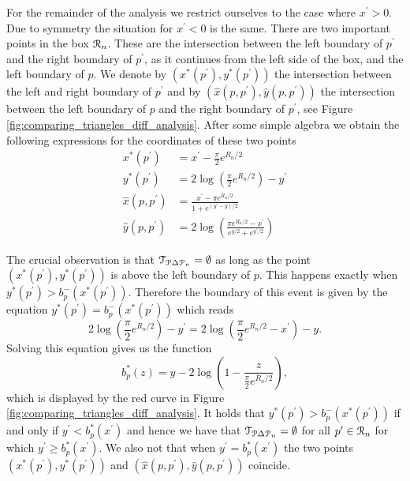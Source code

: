 For the remainder of the analysis we restrict ourselves to the case where $x^\prime > 0$. Due to symmetry the situation for $x^\prime < 0$ is the same. There are two important points in the box ${\mathcal R}_n$. These are the intersection between the left boundary of $p^\prime$ and the right boundary of $p^\prime$, as it continues from the left side of the box, and the left boundary of $p$. We denote by $(x^\ast(p^\prime), y^\ast(p^\prime))$ the intersection between the left and right boundary of $p^\prime$ and by $(\hat{x}(p,p^\prime), \hat{y}(p,p^\prime))$ the intersection between the left boundary of $p$ and the right boundary of $p^\prime$, see Figure \ref{fig:comparing_triangles_diff_analysis}. After some simple algebra we obtain the following expressions for the coordinates of these two points
\begin{align*}
	x^\ast(p^\prime) &= x^\prime - \frac{\pi}{2} e^{R_n/2}\\
	y^\ast(p^\prime) &= 2\log\left(\frac{\pi}{2}e^{R_n/2}\right) - y^\prime\\
	\hat{x}(p,p^\prime) &= \frac{x^\prime - \pi e^{R_n/2}}{1 + e^{(y^\prime - y)/2}} \\
	\hat{y}(p,p^\prime) &= 2 \log\left(\frac{\pi e^{R_n/2} - x^\prime}{e^{y/2} + e^{y^\prime/2}}\right)
\end{align*}

The crucial observation is that $\mathcal{T}_{{\mathcal P} \Delta {\mathcal P}_n} = \emptyset$ as long as the point $(x^\ast(p^\prime), y^\ast(p^\prime))$ is above the left boundary of $p$. This happens exactly when $y^\ast(p^\prime) > b_p^-(x^\ast(p^\prime))$. Therefore the boundary of this event is given by the equation $y^\ast(p^\prime) = b_p^-(x^\ast(p^\prime))$ which reads
\[
	2\log\left(\frac{\pi}{2}e^{R_n/2}\right) - y^\prime = 2\log\left(\frac{\pi}{2} e^{R_n/2} -x^\prime\right) - y.
\]
Solving this equation gives us the function
\begin{equation}
	b^\ast_p(z) = y - 2\log\left(1 - \frac{z}{\frac{\pi}{2} e^{R_n/2}}\right),
\end{equation}
which is displayed by the red curve in Figure \ref{fig:comparing_triangles_diff_analysis}. It holds that $y^\ast(p^\prime) > b_p^-(x^\ast(p^\prime))$ if and only if $y^\prime < b^\ast_p(x^\prime)$ and hence we have that $\mathcal{T}_{{\mathcal P} \Delta {\mathcal P}_n} = \emptyset$ for all $p^\prime \in {\mathcal R}_n$ for which $y^\prime \ge b^\ast_p(x^\prime)$. We also not that when $y^\prime = b^\ast_p(x^\prime)$ the two points $(x^\ast(p^\prime), y^\ast(p^\prime))$ and $(\hat{x}(p,p^\prime),\hat{y}(p,p^\prime))$ coincide.



